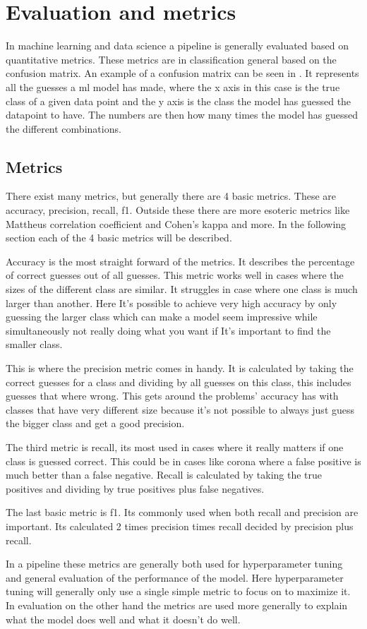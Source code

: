 \section{Evaluation and metrics}\label{sec:evalueation}

In machine learning and data science a pipeline is generally evaluated based on quantitative metrics. These metrics are in classification general based on the confusion matrix. An example of a confusion matrix can be seen in . It represents all the guesses a ml model has made, where the x axis in this case is the true class of a given data point and the y axis is the class the model has guessed the datapoint to have. The numbers are then how many times the model has guessed the different combinations. \cite{james-statistical-learning}

\subsection*{Metrics}

There exist many metrics, but generally there are 4 basic metrics. These are accuracy, precision, recall, f1. Outside these there are more esoteric metrics like Mattheus correlation coefficient and Cohen's kappa and more. In the following section each of the 4 basic metrics will be described. \cite{metrics-for-multi}

Accuracy is the most straight forward of the metrics. It describes the percentage of correct guesses out of all guesses. This metric works well in cases where the sizes of the different class are similar. It struggles in case where one class is much larger than another. Here It's possible to achieve very high accuracy by only guessing the larger class which can make a model seem impressive while simultaneously not really doing what you want if It's important to find the smaller class.

This is where the precision metric comes in handy. It is calculated by taking the correct guesses for a class and dividing by all guesses on this class, this includes guesses that where wrong. This gets around the problems' accuracy has with classes that have very different size because it's not possible to always just guess the bigger class and get a good precision.

The third metric is recall, its most used in cases where it really matters if one class is guessed correct. This could be in cases like corona where a false positive is much better than a false negative. Recall is calculated by taking the true positives and dividing by true positives plus false negatives.

The last basic metric is f1. Its commonly used when both recall and precision are important. Its calculated 2 times precision times recall decided by precision plus recall.


In a pipeline these metrics are generally both used for hyperparameter tuning and general evaluation of the performance of the model. Here hyperparameter tuning will generally only use a single simple metric to focus on to maximize it. In evaluation on the other hand the metrics are used more generally to explain what the model does well and what it doesn't do well. \cite{james-statistical-learning}